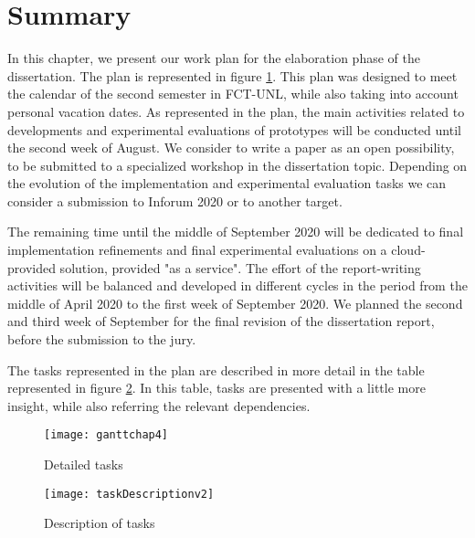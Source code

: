\section{Summary}


In this chapter, we present our work plan for the elaboration phase of the dissertation. The plan is represented in figure \ref{fig:ganttPlannedTasks}. This plan was designed to meet the calendar of the second semester in FCT-UNL, while also taking into account personal vacation dates. As represented in the plan, the main activities related to developments and experimental evaluations of prototypes will be conducted until the second week of August. 
We consider to write a paper as an open possibility, to be submitted to a specialized workshop in the dissertation topic. Depending on the evolution of the implementation and experimental evaluation tasks we can consider a submission to Inforum 2020 or to another target.

The remaining time until the middle of September 2020 will be dedicated to final implementation refinements and final experimental evaluations on a cloud-provided solution, provided "as a service". The effort of the report-writing activities will be balanced and developed in different cycles in the period from the middle of April 2020 to the first week of September 2020. We planned the second and third week of September for the final revision of the dissertation report, before the submission to the jury. 

The tasks represented in the plan are described in more detail in the table represented in figure \ref{fig:taskDescription}. In this table, tasks are presented with a little more insight, while also referring the relevant dependencies.

\newpage

\begin{figure}[htbp]
	\centerline{\texttt{[image: ganttchap4]}}
	\caption{Detailed tasks}
	\label{fig:ganttPlannedTasks}
\end{figure}

\newpage

\begin{figure}[htbp]
	\centerline{\texttt{[image: taskDescriptionv2]}}
	\caption{Description of tasks}
	\label{fig:taskDescription}
\end{figure}


